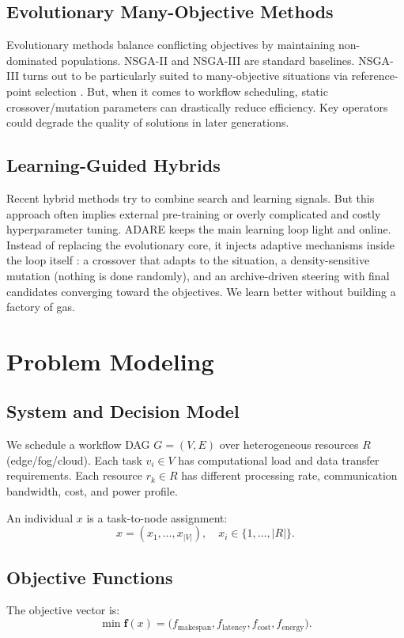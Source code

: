 \documentclass[conference]{IEEEtran}
\begin{document}
\subsection{Evolutionary Many-Objective Methods}
Evolutionary methods balance conflicting objectives by maintaining non-dominated populations. NSGA-II and NSGA-III are standard baselines. NSGA-III turns out to be particularly suited to many-objective situations via reference-point selection \cite{deb2014nsga3}. But, when it comes to workflow scheduling, static crossover/mutation parameters can drastically reduce efficiency. Key operators could degrade the quality of solutions in later generations.

\subsection{Learning-Guided Hybrids}
Recent hybrid methods try to combine search and learning signals. But this approach often implies external pre-training or overly complicated and costly hyperparameter tuning. ADARE keeps the main learning loop light and online. Instead of replacing the evolutionary core, it injects adaptive mechanisms inside the loop itself : a crossover that adapts to the situation, a density-sensitive mutation (nothing is done randomly), and an archive-driven steering with final candidates converging toward the objectives. We learn better without building a factory of gas.

\section{Problem Modeling}
\subsection{System and Decision Model}
We schedule a workflow DAG $G=(V,E)$ over heterogeneous resources $R$ (edge/fog/cloud). Each task $v_i \in V$ has computational load and data transfer requirements. Each resource $r_k \in R$ has different processing rate, communication bandwidth, cost, and power profile.

An individual $x$ is a task-to-node assignment:
\begin{equation}
x = (x_1,\dots,x_{|V|}), \quad x_i \in \{1,\dots,|R|\}.
\end{equation}

\subsection{Objective Functions}
The objective vector is:
\begin{equation}
\min \mathbf{f}(x)=\big(f_{\text{makespan}},f_{\text{latency}},f_{\text{cost}},f_{\text{energy}}\big).
\end{equation}
\end{document}
